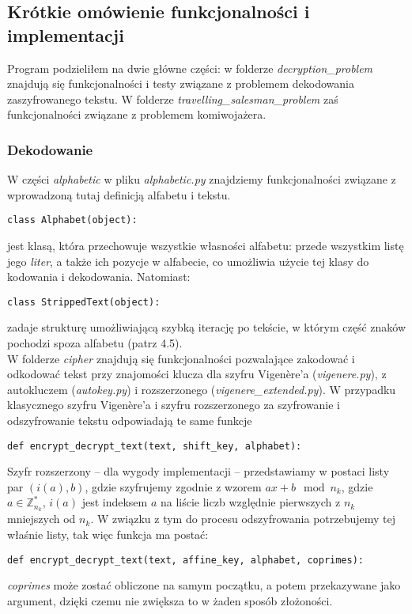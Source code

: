 \documentclass[a4paper]{article}
\theoremstyle{defn}
\theoremstyle{theorem}
\theoremstyle{lemma}
\theoremstyle{cor}
\theoremstyle{fact}
\begin{document}
\subsection{Krótkie omówienie funkcjonalności i implementacji}
Program podzieliłem na dwie główne części: w folderze \textit{decryption\_problem} znajdują się funkcjonalności i testy związane z problemem dekodowania zaszyfrowanego tekstu. W folderze \textit{travelling\_salesman\_problem} zaś funkcjonalności związane z problemem komiwojażera.
\subsubsection{Dekodowanie}
W części \textit{alphabetic} w pliku \textit{alphabetic.py} znajdziemy funkcjonalności związane z wprowadzoną tutaj definicją alfabetu i tekstu.
\begin{lstlisting}
class Alphabet(object):
\end{lstlisting}
jest klasą, która przechowuje wszystkie własności alfabetu: przede wszystkim listę jego \textit{liter}, a także ich pozycje w alfabecie, co umożliwia użycie tej klasy do kodowania i dekodowania. Natomiast:
\begin{lstlisting}
class StrippedText(object):
\end{lstlisting}
zadaje strukturę umożliwiającą szybką iterację po tekście, w którym część znaków pochodzi spoza alfabetu (patrz 4.5).\\
W folderze \textit{cipher} znajdują się funkcjonalności pozwalające zakodować i odkodować tekst przy znajomości klucza dla szyfru Vigenère'a (\textit{vigenere.py}), z autokluczem (\textit{autokey.py}) i rozszerzonego (\textit{vigenere\_extended.py}). W przypadku klasycznego szyfru Vigenère'a i szyfru rozszerzonego za szyfrowanie i odszyfrowanie tekstu odpowiadają te same funkcje
\begin{lstlisting}
def encrypt_decrypt_text(text, shift_key, alphabet):
\end{lstlisting}
Szyfr rozszerzony – dla wygody implementacji – przedstawiamy w postaci listy par $(i(a),b)$, gdzie szyfrujemy zgodnie z wzorem $ax+b \mod n_k$, gdzie $a \in \mathbb{Z}_{n_k}^*$, $i(a)$ jest indeksem $a$ na liście liczb względnie pierwszych z $n_k$ mniejszych od $n_k$. W związku z tym do procesu odszyfrowania potrzebujemy tej właśnie listy, tak więc funkcja ma postać:
\begin{lstlisting}
def encrypt_decrypt_text(text, affine_key, alphabet, coprimes):
\end{lstlisting}
\textit{coprimes} może zostać obliczone na samym początku, a potem przekazywane jako argument, dzięki czemu nie zwiększa to w żaden sposób złożoności.
\end{document}
